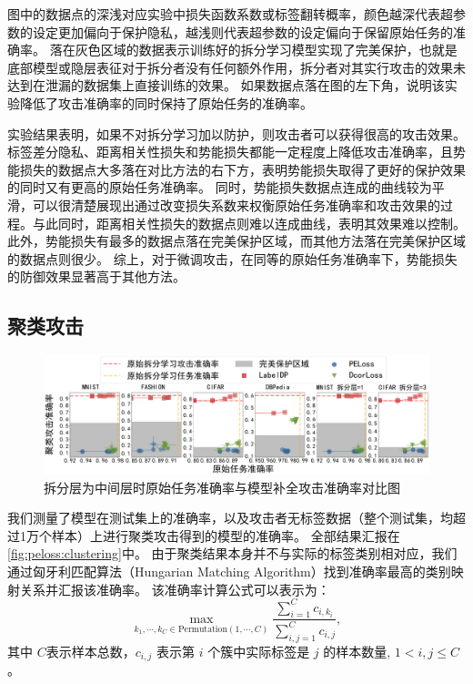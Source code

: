 图中的数据点的深浅对应实验中损失函数系数或标签翻转概率，颜色越深代表超参数的设定更加偏向于保护隐私，越浅则代表超参数的设定偏向于保留原始任务的准确率。
%
落在灰色区域的数据表示训练好的拆分学习模型实现了完美保护，也就是底部模型或隐层表征对于拆分者没有任何额外作用，拆分者对其实行攻击的效果未达到在泄漏的数据集上直接训练的效果。
%
如果数据点落在图的左下角，说明该实验降低了攻击准确率的同时保持了原始任务的准确率。

实验结果表明，如果不对拆分学习加以防护，则攻击者可以获得很高的攻击效果。
%
标签差分隐私、距离相关性损失和势能损失都能一定程度上降低攻击准确率，且势能损失的数据点大多落在对比方法的右下方，表明势能损失取得了更好的保护效果的同时又有更高的原始任务准确率。
%
同时，势能损失数据点连成的曲线较为平滑，可以很清楚展现出通过改变损失系数来权衡原始任务准确率和攻击效果的过程。与此同时，距离相关性损失的数据点则难以连成曲线，表明其效果难以控制。
%
此外，势能损失有最多的数据点落在完美保护区域，而其他方法落在完美保护区域的数据点则很少。
%
综上，对于微调攻击，在同等的原始任务准确率下，势能损失的防御效果显著高于其他方法。




\subsection{聚类攻击}
\begin{figure}[h!]
    \centering
    \includegraphics[width=1\linewidth]{Z_Resources/peloss_cluster-attack-both}
    \caption{拆分层为中间层时原始任务准确率与模型补全攻击准确率对比图}
    \label{fig:peloss:clustering}
\end{figure}

我们测量了模型在测试集上的准确率，以及攻击者无标签数据（整个测试集，均超过1万个样本）上进行聚类攻击得到的模型的准确率。
全部结果汇报在\autoref{fig:peloss:clustering}中。
%
由于聚类结果本身并不与实际的标签类别相对应，我们通过匈牙利匹配算法（Hungarian Matching Algorithm）找到准确率最高的类别映射关系并汇报该准确率。
该准确率计算公式可以表示为：
\begin{equation}
    \max\limits_{k_1,\cdots,k_C \in \text{Permutation}(1,\cdots,C)} \dfrac{\sum_{i=1}^C c_{i,k_i}}{\sum_{i,j=1}^C c_{i,j}},
\end{equation}
其中 $C$表示样本总数，$c_{i,j}$ 表示第 $i$ 个簇中实际标签是 $j$ 的样本数量, $1 < i, j \le C$。

